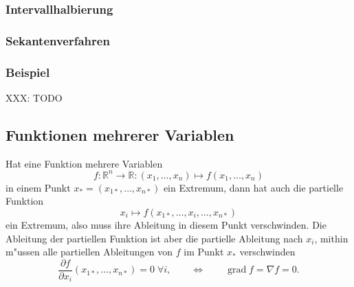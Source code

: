 \subsubsection{Intervallhalbierung}

\subsubsection{Sekantenverfahren}


\subsubsection{Beispiel}
XXX: TODO

\subsection{Funktionen mehrerer Variablen}
Hat eine Funktion mehrere Variablen
\[
f\colon\mathbb R^n\to\mathbb R:(x_1,\dots,x_n)\mapsto f(x_1,\dots,x_n)
\]
in einem Punkt $x_*=(x_{1*},\dots,x_{n*})$ ein Extremum,
dann hat auch die partielle Funktion
\[
x_i\mapsto f(x_{1*},\dots,x_i,\dots,x_{n*})
\]
ein Extremum, also muss ihre Ableitung in diesem Punkt
verschwinden. Die Ableitung der partiellen Funktion ist aber
die partielle Ableitung nach $x_i$, mithin m"ussen
alle partiellen Ableitungen von $f$ im Punkt $x_*$ verschwinden
\begin{equation}
\frac{\partial f}{\partial x_i}(x_{1*},\dots,x_{n*})=0\;\forall i,
\qquad \Leftrightarrow\qquad
\operatorname{grad}f=\nabla f=0.
\end{equation}

